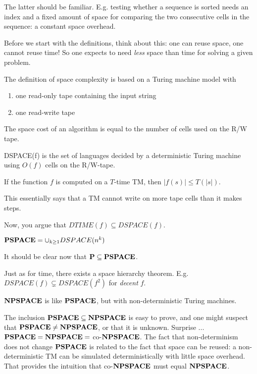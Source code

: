 The latter should be familiar. E.g. testing whether a sequence is
sorted needs an index and a fixed amount of space for comparing the
two consecutive cells in the sequence: a constant space overhead.

Before we start with the definitions, think about this: one can reuse
space, one cannot reuse time! So one expects to need {\em less} space
than time for solving a given problem.

The definition of space complexity is based on a Turing machine model
with
\begin{enumerate}
\item one read-only tape containing the input string

\item one read-write tape
\end{enumerate}
The space cost of an algorithm is equal to the number of cells used on
the R/W tape.

\begin{definition}
DSPACE(f) is the set of languages decided by a deterministic Turing
machine using $O(f)$ cells on the R/W-tape.
\end{definition}

\begin{lemma} \label{grootte_van_string}
If the function $f$ is computed on a $T$-time TM, then
%
$|f(s)| \leq T(|s|)$.
\end{lemma}
This essentially says that a TM cannot write on more tape cells than
it makes steps.

Now, you argue that $DTIME(f) \subseteq DSPACE(f)$.

\begin{definition}
${\bf PSPACE} = \cup_{k\geq 1} DSPACE(n^k)$
\end{definition}

It should be clear now that ${\bf P} \subseteq {\bf PSPACE}$.

Just as for time, there exists a space hierarchy
theorem. E.g. $DSPACE(f) \subsetneq DSPACE(f^2)$ for {\em decent} $f$.

\begin{definition}
${\bf NPSPACE}$ is like ${\bf PSPACE}$, but with non-deterministic Turing
  machines.
\end{definition}

The inclusion ${\bf PSPACE} \subseteq {\bf NPSPACE}$ is easy to prove, and one
might suspect that ${\bf PSPACE} \neq {\bf NPSPACE}$, or that it is unknown.
Surprise ... ${\bf PSPACE} = {\bf NPSPACE} =$ co-${\bf NPSPACE}$. The fact that
non-determinism does not change ${\bf PSPACE}$ is related to the fact that
space can be reused: a non-deterministic TM can be simulated
deterministically with little space overhead. That provides the
intuition that co-${\bf NPSPACE}$ must equal ${\bf NPSPACE}$.


